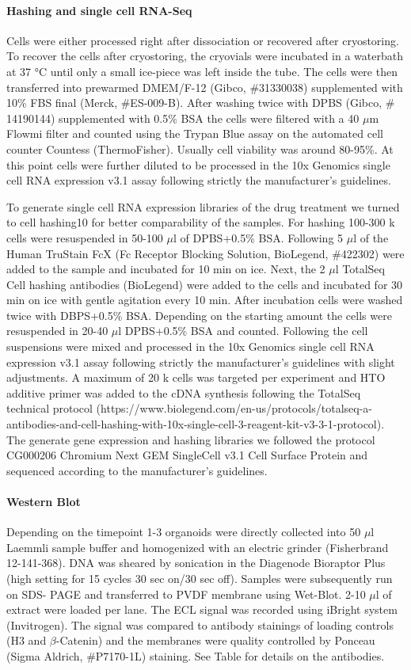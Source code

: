 \paragraph{Hashing and single cell RNA-Seq}
Cells were either processed right after dissociation or recovered after cryostoring.  To recover the cells after cryostoring, the cryovials were incubated in a waterbath at 37 °C until only a small ice-piece was left inside the tube. The cells were then transferred into prewarmed DMEM/F-12 (Gibco, \#31330038) supplemented with 10\% FBS final (Merck, \#ES-009-B). After washing twice with DPBS (Gibco, \# 14190144) supplemented with 0.5\% BSA the cells were filtered with a 40 $\mu$m Flowmi filter and counted using the Trypan Blue assay on the automated cell counter Countess (ThermoFisher). Usually cell viability was around 80-95\%. At this point cells were further diluted to be processed in the 10x Genomics single cell RNA expression v3.1 assay following strictly the manufacturer's guidelines.

To generate single cell RNA expression libraries of the drug treatment we turned to cell hashing10 for better comparability of the samples. For hashing 100-300 k cells were resuspended in 50-100 $\mu$l of DPBS+0.5\% BSA. Following 5 $\mu$l of the Human TruStain FcX (Fc Receptor Blocking Solution, BioLegend, \#422302) were added to the sample and incubated for 10 min on ice.  Next, the 2 $\mu$l TotalSeq Cell hashing antibodies (BioLegend) were added to the cells and incubated for 30 min on ice with gentle agitation every 10 min. After incubation cells were washed twice with DBPS+0.5\% BSA. Depending on the starting amount the cells were resuspended in 20-40 $\mu$l DPBS+0.5\% BSA and counted. Following the cell suspensions were mixed and processed in the 10x Genomics single cell RNA expression v3.1 assay following strictly the manufacturer's guidelines with slight adjustments. A maximum of 20 k cells was targeted per experiment and HTO additive primer was added to the cDNA synthesis following the TotalSeq technical protocol (https://www.biolegend.com/en-us/protocols/totalseq-a-antibodies-and-cell-hashing-with-10x-single-cell-3-reagent-kit-v3-3-1-protocol). The generate gene expression and hashing libraries we followed the protocol CG000206 Chromium Next GEM SingleCell v3.1 Cell Surface Protein and sequenced according to the manufacturer's guidelines.

\paragraph{Western Blot}
Depending on the timepoint 1-3 organoids were directly collected into 50 $\mu$l Laemmli sample buffer and homogenized with an electric grinder (Fisherbrand 12-141-368). DNA was sheared by sonication in the Diagenode Bioraptor Plus (high setting for 15 cycles 30 sec on/30 sec off). Samples were subsequently run on SDS- PAGE and transferred to PVDF membrane using Wet-Blot. 2-10 $\mu$l of extract were loaded per lane. The ECL signal was recorded using iBright system (Invitrogen). The signal was compared to antibody stainings of loading controls (H3 and $\beta$-Catenin) and the membranes were quality controlled by Ponceau (Sigma Aldrich, \#P7170-1L) staining. See Table for details on the antibodies.

